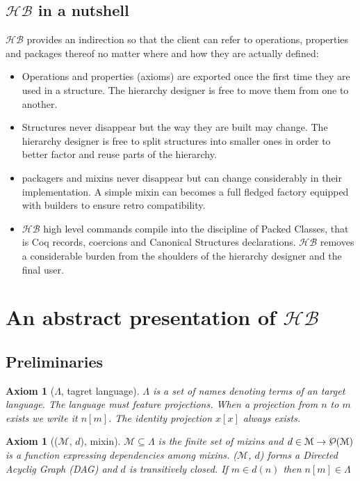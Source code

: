 \documentclass[a4paper,UKenglish,cleveref, autoref]{lipics-v2019}
\newcommand{\HB}{\ensuremath{\mathcal{HB}}}
\newcommand{\Lang}{\ensuremath{\Lambda}}
\newcommand{\mixin}{mixin}
\newcommand{\mixins}{mixins}
\newcommand{\M}{\ensuremath{\mathcal{M}}}
\newcommand{\factory}{factory}
\newcommand{\Packager}{packager}
\newcommand{\builder}{builder}
\newcommand{\depx}{\ensuremath{d}}
\newcommand{\powerset}[1]{\raisebox{.15\baselineskip}{\Large\ensuremath{\wp}}(#1)}
\newcommand{\proj}[2]{\ensuremath{#1[#2]}}
\theoremstyle{implem}
\theoremstyle{implem}
\newcounter{axiomcounter}
\theoremstyle{axiom}
\newtheorem{axiom}[axiomcounter]{Axiom}
\theoremstyle{abscommand}
\theoremstyle{command}
\begin{document}
\subsection{\HB{} in a nutshell}

\HB{} provides an indirection so that the client can refer to operations,
properties and packages thereof no matter where and how they are actually
defined:

\begin{itemize}
\item Operations and properties (axioms) are exported once the first time they
      are used in a structure. The hierarchy designer is free to move them from
      one to another.
\item Structures never disappear but the way they are built may change.
      The hierarchy designer is free to split structures into smaller
      ones in order to better factor and reuse parts of the hierarchy.
\item \Packager{}s and \mixins{} never disappear but can change considerably
      in their implementation. A simple \mixin{} can becomes a full fledged
      \factory{} equipped with \builder{}s to ensure retro compatibility.
\item \HB{} high level commands compile into
      the discipline of Packed Classes, that is Coq records, coercions
      and Canonical Structures declarations. \HB{} removes a considerable burden
      from the shoulders of the hierarchy designer and the final user.
\end{itemize}

\section{An abstract presentation of \HB{}}

\subsection{Preliminaries}

\begin{axiom}[\Lang{}, tagret language]\label{def:universe}
  \Lang{} is a set of names denoting terms of an target language.
  The language must feature projections. When
  a projection from $n$ to $m$ exists we write it \proj{n}{m}.
  The identity projection \proj{x}{x} always exists.
\end{axiom}

\begin{axiom}[(\M{}, \depx{}), \mixin{}]\label{def:mixin}
\( \M{} \subseteq \Lang{} \) is the finite set of \mixins{} and
\( \depx \in \M{} \to \powerset\M{} \) is a function expressing
dependencies among \mixins{}.
(\M{}, \depx{}) forms a Directed Acyclig Graph (DAG) and
\depx{} is transitively closed.
If \(m \in \depx{}(n) \) then \( \proj{n}{m} \in \Lang{} \)
\end{axiom}
\end{document}
